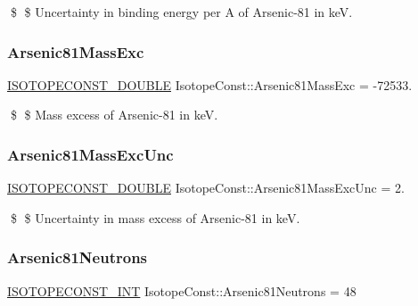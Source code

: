 \$ \$ Uncertainty in binding energy per A of Arsenic-\/81 in keV. \mbox{\label{group___isotope_const-_arsenic-_as81_gadb0ac1bd6c7d2a56df6c890e19cc5f3d}} 
\subsubsection{\texorpdfstring{Arsenic81\+Mass\+Exc}{Arsenic81MassExc}}
{\footnotesize\ttfamily \mbox{\hyperlink{group___isotope_const-_macros_ga8f45a7272ce02c0b4c65c44636ed719a}{I\+S\+O\+T\+O\+P\+E\+C\+O\+N\+S\+T\+\_\+\+D\+O\+U\+B\+LE}} Isotope\+Const\+::\+Arsenic81\+Mass\+Exc = -\/72533.}

\$ \$ Mass excess of Arsenic-\/81 in keV. \mbox{\label{group___isotope_const-_arsenic-_as81_ga84d05e570efd7d21d4a19b871cb5d242}} 
\subsubsection{\texorpdfstring{Arsenic81\+Mass\+Exc\+Unc}{Arsenic81MassExcUnc}}
{\footnotesize\ttfamily \mbox{\hyperlink{group___isotope_const-_macros_ga8f45a7272ce02c0b4c65c44636ed719a}{I\+S\+O\+T\+O\+P\+E\+C\+O\+N\+S\+T\+\_\+\+D\+O\+U\+B\+LE}} Isotope\+Const\+::\+Arsenic81\+Mass\+Exc\+Unc = 2.}

\$ \$ Uncertainty in mass excess of Arsenic-\/81 in keV. \mbox{\label{group___isotope_const-_arsenic-_as81_ga17ca9dda7857f3316123dbb0758d078e}} 
\subsubsection{\texorpdfstring{Arsenic81\+Neutrons}{Arsenic81Neutrons}}
{\footnotesize\ttfamily \mbox{\hyperlink{group___isotope_const-_macros_ga5f18360b3e99483a35c32d789e62621c}{I\+S\+O\+T\+O\+P\+E\+C\+O\+N\+S\+T\+\_\+\+I\+NT}} Isotope\+Const\+::\+Arsenic81\+Neutrons = 48}

